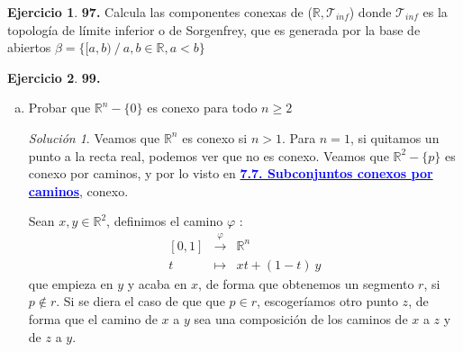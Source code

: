 \documentclass[12pt,twoside]{report}
\newcommand\mc[1]{\mathcal{#1}}
\theoremstyle{azul}
\theoremstyle{azul2}
\theoremstyle{plain}
\theoremstyle{definition}
\newtheorem*{ejern}{Ejercicio}
\theoremstyle{remark}
\newtheorem*{sol}{Solución}
\begin{document}
\begin{ejern} \textbf{97.}
Calcula las componentes conexas de ($\mathbb{R}, \mc{T}_{inf}$) donde $\mc{T}_{inf}$ es la topología de límite inferior o de Sorgenfrey, que es generada por la base de abiertos $\beta=\{[a,b) \: / \: a,b \in \mathbb{R}, a < b \}$
\end{ejern}
\; \vspace{-5mm}
\begin{ejern} \textbf{99. }
\begin{enumerate}[a)]
    \item Probar que $\mathbb{R}^n - \{0\}$ es conexo para todo $n \geq 2$
    \begin{sol}
    Veamos que $\mathbb{R}^n$ es conexo si $n>1$. Para $n=1$, si quitamos un punto a la recta real, podemos ver que no es conexo. Veamos que $\mathbb{R}^2 - \{p\}$ es conexo por caminos, y por lo visto en \hyperref[cpc]{\textcolor{blue}{\textbf{7.7. Subconjuntos conexos por caminos}}}, conexo.
    
    Sean $x,y \in \mathbb{R}^2$, definimos el camino $\varphi$ :
    $$\begin{array}{rcl}
         [0,1] & \stackrel{\varphi}{\longrightarrow} & \mathbb{R}^n \\
         t & \longmapsto & xt+(1-t) \: y 
    \end{array}$$
    que empieza en $y$ y acaba en $x$, de forma que obtenemos un segmento $r$, si $p \nin r$. Si se diera el caso de que que $p \in r$, escogeríamos otro punto $z$, de forma que el camino de $x$ a $y$ sea una composición de los caminos de $x$ a $z$ y de $z$ a $y$. 
    

\end{sol}
\end{enumerate}
\end{ejern}
\end{document}

